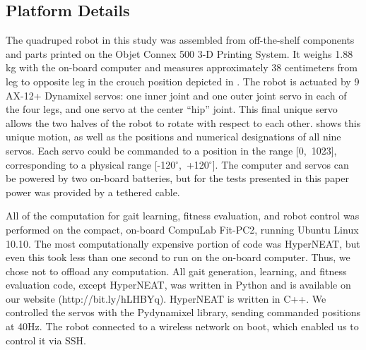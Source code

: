 \subsection{Platform Details}






The quadruped robot in this study was assembled from off-the-shelf components and parts
printed on the Objet Connex 500 3-D Printing System. It weighs 1.88 kg
with the on-board computer and measures approximately 38 centimeters
from leg to opposite leg in the crouch position depicted in
. The robot is actuated by 9 AX-12+
Dynamixel servos: one inner joint and one outer joint servo in each of
the four legs, and one servo at the center ``hip'' joint.  This final
unique servo allows the two halves of the robot to rotate with respect
to each other.  shows this unique motion, as well
as the positions and numerical designations of all nine servos.  Each
servo could be commanded to a position in the range [0,~1023],
corresponding to a physical range [-120$^{\circ}$,~+120$^{\circ}$].
The computer and servos can be powered by two on-board batteries, but
for the tests presented in this paper power was provided by a tethered
cable.

All of the computation for gait learning, fitness evaluation, and
robot control was performed on the compact, on-board CompuLab Fit-PC2,
running Ubuntu Linux 10.10. 
The most computationally expensive portion of code was HyperNEAT, but even
this took less than one second to run on the on-board computer. Thus,
we chose not to offload any computation.
All gait generation, learning, and fitness
evaluation code, except HyperNEAT, was written in Python and is
available on our website (http://bit.ly/hLHBYq).  HyperNEAT is written in
C++.  We controlled the servos with the Pydynamixel library, sending commanded positions at 40Hz.  The robot
connected to a wireless network on boot, which enabled us to control
it via SSH.


